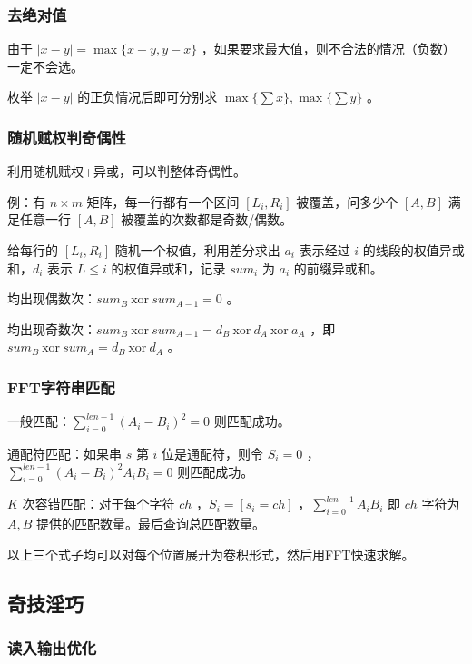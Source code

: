 


\subsubsection{去绝对值}

由于 $|x-y|=\max\{x-y,y-x\}$ ，如果要求最大值，则不合法的情况（负数）一定不会选。

枚举 $|x-y|$ 的正负情况后即可分别求 $\max\{\sum x\},\max\{\sum y\}$ 。

\newpage

\subsubsection{随机赋权判奇偶性}

利用随机赋权+异或，可以判整体奇偶性。

例：有 $n\times m$ 矩阵，每一行都有一个区间 $[L_i,R_i]$ 被覆盖，问多少个 $[A,B]$ 满足任意一行 $[A,B]$ 被覆盖的次数都是奇数/偶数。

给每行的 $[L_i,R_i]$ 随机一个权值，利用差分求出 $a_i$ 表示经过 $i$ 的线段的权值异或和，$d_i$ 表示 $L\le i$ 的权值异或和，记录 $sum_i$ 为 $a_i$ 的前缀异或和。

均出现偶数次：$sum_B\ \text{xor}\ sum_{A-1}=0$ 。

均出现奇数次：$sum_B\ \text{xor}\ sum_{A-1}=d_{B}\ \text{xor}\ d_{A}\ \text{xor}\ a_A$ ，即 $sum_B\ \text{xor}\ sum_{A}=d_{B}\ \text{xor}\ d_{A}$ 。


\subsubsection{FFT字符串匹配}

一般匹配：$\sum_{i=0}^{len-1}(A_i-B_i)^2=0$ 则匹配成功。

通配符匹配：如果串 $s$ 第 $i$ 位是通配符，则令 $S_i=0$ ，$\sum_{i=0}^{len-1}(A_i-B_i)^2A_iB_i=0$ 则匹配成功。

$K$ 次容错匹配：对于每个字符 $ch$ ，$S_i=[s_i=ch]$ ，$\sum_{i=0}^{len-1}A_iB_i$ 即 $ch$ 字符为 $A,B$ 提供的匹配数量。最后查询总匹配数量。

以上三个式子均可以对每个位置展开为卷积形式，然后用FFT快速求解。

\subsection{奇技淫巧}

\subsubsection{读入输出优化}

